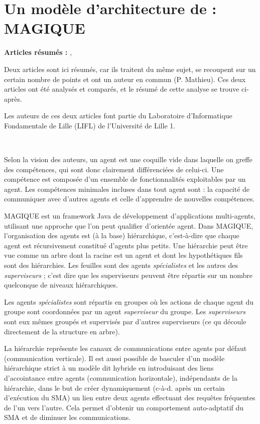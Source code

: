\section{Un modèle d'architecture de  : MAGIQUE}
\textbf{Articles résumés :} \cite{m1}, \cite{m2}

Deux articles sont ici résumés, car ils traitent du même sujet, se recoupent sur un certain nombre de points et ont un auteur en commun (P. Mathieu). Ces deux articles ont été analysés et comparés, et le résumé de cette analyse se trouve ci-après.



Les auteurs de ces deux articles font partie du Laboratoire d'Informatique Fondamentale de Lille (LIFL) de l'Université de Lille 1.

~

Selon la vision des auteurs, un agent est une \og{}coquille vide\fg{} dans laquelle on greffe des compétences, qui sont donc clairement différenciées de celui-ci. Une compétence est composée d'un ensemble de fonctionnalités exploitables par un agent. Les compétences minimales incluses dans tout agent sont : la capacité de communiquer avec d'autres agents et celle d'apprendre de nouvelles compétences.

MAGIQUE est un framework Java de développement d'applications multi-agents, utilisant une approche que l'on peut qualifier d'\og{}orientée agent\fg{}. Dans MAGIQUE, l'organisation des agents est (à la base) hiérarchique, c'est-à-dire que chaque agent est récursivement constitué d'agents plus petits. Une hiérarchie peut être vue comme un arbre dont la racine est un agent et dont les hypothétiques fils sont des hiérarchies. Les feuilles sont des agents \emph{spécialistes} et les autres des \emph{superviseurs} ; c'est dire que les superviseurs peuvent être répartis sur un nombre quelconque de niveaux hiérarchiques.

Les agents \emph{spécialistes} sont répartis en groupes où les actions de chaque agent du groupe sont coordonnées par un agent \emph{superviseur} du groupe. Les \emph{superviseurs} sont eux mêmes groupés et supervisés par d'autres superviseurs (ce qu découle directement de la structure en arbre).

La hiérarchie représente les canaux de communications entre agents par défaut (communication verticale). Il est aussi possible de basculer d'un modèle hiérarchique strict à un modèle dit \og{}hybride\fg{} en introduisant des liens d'\og{}accointance\fg{} entre agents (communication horizontale), indépendants de la hiérarchie, dans le but de créer dynamiquement (c-à-d. après un certain d'exécution du SMA) un lien entre deux agents effectuant des requêtes fréquentes de l'un vers l'autre. Cela permet d'obtenir un comportement auto-adptatif du SMA et de diminuer les communications.

